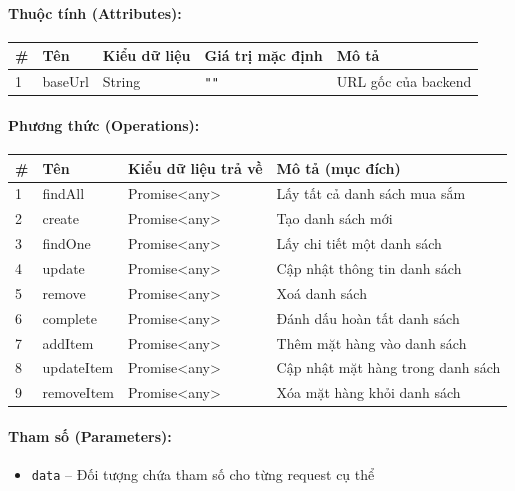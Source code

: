 \documentclass[12pt,a4paper]{article}
\begin{document}
\paragraph{Thuộc tính (Attributes):}
\begin{longtable}{|p{0.6cm}|p{2.8cm}|p{2.2cm}|p{1.8cm}|p{5.8cm}|}
\hline
\textbf{\#} & \textbf{Tên} & \textbf{Kiểu dữ liệu} & \textbf{Giá trị mặc định} & \textbf{Mô tả} \\ \hline
\endhead
1 & baseUrl & String & \texttt{""} & URL gốc của backend \\ \hline
\end{longtable}

\paragraph{Phương thức (Operations):}
\begin{longtable}{|p{0.6cm}|p{3.8cm}|p{2.6cm}|p{6.5cm}|}
\hline
\textbf{\#} & \textbf{Tên} & \textbf{Kiểu dữ liệu trả về} & \textbf{Mô tả (mục đích)} \\ \hline
\endhead
1 & findAll & Promise\textless{}any\textgreater{} & Lấy tất cả danh sách mua sắm \\ \hline
2 & create & Promise\textless{}any\textgreater{} & Tạo danh sách mới \\ \hline
3 & findOne & Promise\textless{}any\textgreater{} & Lấy chi tiết một danh sách \\ \hline
4 & update & Promise\textless{}any\textgreater{} & Cập nhật thông tin danh sách \\ \hline
5 & remove & Promise\textless{}any\textgreater{} & Xoá danh sách \\ \hline
6 & complete & Promise\textless{}any\textgreater{} & Đánh dấu hoàn tất danh sách \\ \hline
7 & addItem & Promise\textless{}any\textgreater{} & Thêm mặt hàng vào danh sách \\ \hline
8 & updateItem & Promise\textless{}any\textgreater{} & Cập nhật mặt hàng trong danh sách \\ \hline
9 & removeItem & Promise\textless{}any\textgreater{} & Xóa mặt hàng khỏi danh sách \\ \hline
\end{longtable}

\paragraph{Tham số (Parameters):}
\begin{itemize}[leftmargin=*]
    \item \texttt{data} – Đối tượng chứa tham số cho từng request cụ thể
\end{itemize}
\end{document}
